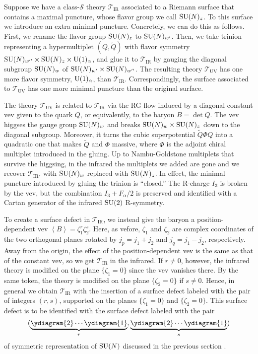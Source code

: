 Suppose we have a class-$\mathcal{S}$ theory $\mathcal{T}_{\mathrm{IR}}$
associated to a Riemann surface that contains a maximal puncture,
whose flavor group we call $\mathrm{SU}(N)_{z}$. To this surface we introduce
an extra minimal puncture. Concretely, we can do this as follows.
First, we rename the flavor group $\mathrm{SU}(N)_{z}$ to $\mathrm{SU}(N)_{w'}$. Then,
we take trinion representing a hypermultiplet $(Q,\tilde{Q})$ with
flavor symmetry $\mathrm{SU}(N)_{w''} \times \mathrm{SU}(N)_{z}\times \mathrm{U}(1)_{\alpha}$,
and glue it to $\mathcal{T}_{\mathrm{IR}}$ by gauging the diagonal
subgroup $\mathrm{SU}(N)_{w}$ of $\mathrm{SU}(N)_{w'}\times \mathrm{SU}(N)_{w''}$. The resulting
theory $\mathcal{T}_{\mathrm{UV}}$ has one more flavor symmetry,
$\mathrm{U}(1)_{\alpha}$, than $\mathcal{T}_{\mathrm{IR}}$. Correspondingly,
the surface associated to $\mathcal{T}_{\mathrm{UV}}$ has one more
minimal puncture than the original surface.

The theory $\mathcal{T}_{\mathrm{UV}}$ is related to $\mathcal{T}_{\mathrm{IR}}$
via the RG flow induced by a diagonal constant vev given to the quark
$Q$, or equivalently, to the baryon $B=\det Q$. The vev higgses
the gauge group $\mathrm{SU}(N)_{w}$ and breaks $\mathrm{SU}(N)_{w} \times \mathrm{SU}(N)_{z}$
down to the diagonal subgroup. Moreover, it turns the cubic superpotential
$\tilde{Q} \Phi Q$ into a quadratic one that makes $\tilde{Q}$ and
$\Phi$ massive, where $\Phi$ is the adjoint chiral multiplet introduced
in the gluing. Up to Nambu-Goldstone multiplets that survive the higgsing,
in the infrared the multiplets we added are gone and we recover $\mathcal{T}_{\mathrm{IR}}$,
with $\mathrm{SU}(N)_{w}$ replaced with $\mathrm{SU}(N)_{z}$. In effect, the minimal
puncture introduced by gluing the trinion is ``closed.'' The R-charge
$I_{3}$ is broken by the vev, but the combination $I_{3}+F_{\alpha}/2$
is preserved and identified with a Cartan generator of the infrared
$\mathrm{SU}(2)$ R-symmetry.

To create a surface defect in $\mathcal{T}_{\mathrm{IR}}$, we instead
give the baryon a position-dependent vev $\left\langle B\right\rangle = \zeta_{1}^{r}\zeta_{2}^{s}$.
Here, as vefore, $\zeta_{1}$ and $\zeta_{2}$ are complex coordinates
of the two orthogonal planes rotated by $j_{p}=j_{1}+j_{2}$ and $j_{q}=j_{1}-j_{2}$,
respectively. Away from the origin, the effect of the position-dependent
vev is the same as that of the constant vev, so we get $\mathcal{T}_{\mathrm{IR}}$
in the infrared. If $r\neq0$, however, the infrared theory is modified
on the plane $\{\zeta_{1}=0\}$ since the vev vanishes there. By the
same token, the theory is modified on the plane $\{\zeta_{2}=0\}$
if $s\neq0$. Hence, in general we obtain $\mathcal{T}_{\mathrm{IR}}$
with the insertion of a surface defect labeled with the pair of integers
$(r,s)$, supported on the planes $\{\zeta_{1}=0\}$ and $\{\zeta_{2}=0\}$.
This surface defect is to be identified with the surface defect labeled
with the pair
\begin{equation*}
  (\underbrace{\ydiagram{2}\cdots\ydiagram{1}}_{r}, \underbrace{\ydiagram{2}\cdots\ydiagram{1}}_{s})
\end{equation*}
of symmetric representation of
$\mathrm{SU}(N)$ discussed in the previous section \cite{Gadde:2013dda}.

